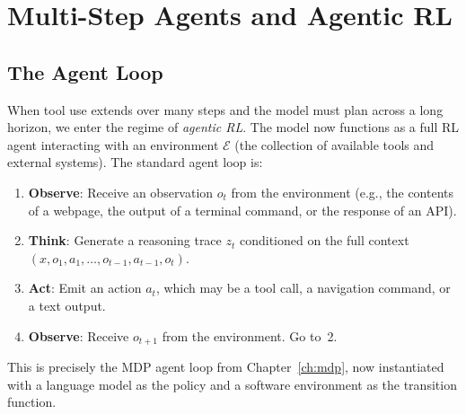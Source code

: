 \section{Multi-Step Agents and Agentic RL}
\label{sec:agentic-rl}

\subsection{The Agent Loop}

When tool use extends over many steps and the model must plan across
a long horizon, we enter the regime of \emph{agentic RL}.
The model now functions as a full RL agent interacting with an
environment $\mathcal{E}$ (the collection of available tools and
external systems). The standard agent loop is:

\begin{enumerate}
\item \textbf{Observe}: Receive an observation $o_t$ from the
  environment (e.g., the contents of a webpage, the output of a
  terminal command, or the response of an API).
\item \textbf{Think}: Generate a reasoning trace $z_t$ conditioned
  on the full context $(x, o_1, a_1, \ldots, o_{t-1}, a_{t-1}, o_t)$.
\item \textbf{Act}: Emit an action $a_t$, which may be a tool call,
  a navigation command, or a text output.
\item \textbf{Observe}: Receive $o_{t+1}$ from the environment. Go to~2.
\end{enumerate}

This is precisely the MDP agent loop from Chapter~\ref{ch:mdp}, now
instantiated with a language model as the policy and a software
environment as the transition function.

